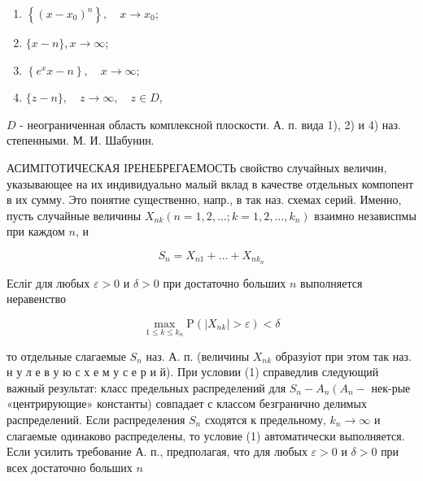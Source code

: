 \documentclass[10pt]{article}
\begin{document}
\begin{enumerate}

  \item $\left\{\left(x-x_{0}\right)^{n}\right\}, \quad x \longrightarrow x_{0}$;



  \item $\{x-n\}, x \longrightarrow \infty$;



  \item $\left\{e^{x} x-n\right\}, \quad x \longrightarrow \infty$;



  \item $\{z-n\}, \quad z \longrightarrow \infty, \quad z \in D$,



\end{enumerate}



$D$ - неограниченная область комплексной плоскости. А. п. вида 1), 2) и 4) наз. степенными. М. И. Шабунин.



АСИМIТОТИЧЕСКАЯ IРЕНЕБРЕГАЕМОСТЬ свойство случайных величин, указывающее на их индивидуально малый вклад в качестве отдельных компопент в их сумму. Это понятие существенно, напр., в так наз. схемах серий. Именно, пусть случайные величины $X_{n k}\left(n=1,2, \ldots ; k=1,2, \ldots, k_{n}\right)$ взаимно независпмы при каждом $n$, и



\[

S_{n}=X_{n 1}+\ldots+X_{n k_{n}}

\]



Есліг для любых $\varepsilon>0$ и $\delta>0$ при достаточно больших $n$ выполняется неравенство



\[

\max _{1 \leqslant k \leqslant k_{n}} \mathrm{P}\left(\left|X_{n k}\right|>\varepsilon\right)<\delta

\]



то отдельные слагаемые $S_{n}$ наз. А. п. (величины $X_{n k}$ образуіот при этом так наз. н у л е в у ю с х е м у с е р и й). При условии (1) справедлив следующий важный результат: класс предельных распределений для $S_{n}-A_{n}\left(A_{n}-\right.$ нек-рые «центрирующие» константы) совпадает с классом безгранично делимых распределений. Если распределения $S_{n}$ сходятся к предельному, $k_{n} \rightarrow \infty$ и слагаемые одинаково распределены, то условие (1) автоматически выполняется. Если усилить требование А. п., предполагая, что для любых $\varepsilon>0$ и $\delta>0$ при всех достаточно больших $n$
\end{document}
